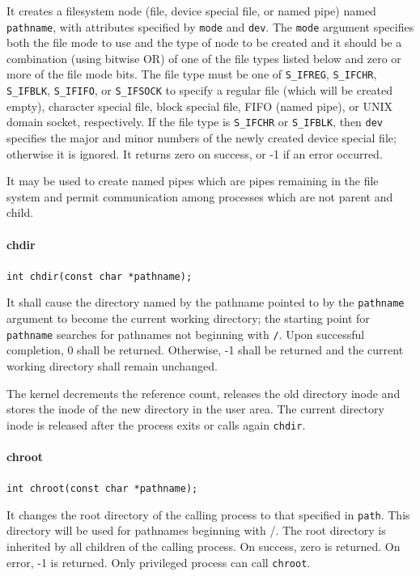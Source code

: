 \documentclass{report}
\begin{document}
It creates a filesystem node (file, device special file, or named pipe) named \texttt{pathname}, with attributes specified by \texttt{mode} and \texttt{dev}. The \texttt{mode} argument specifies both the file mode to use and the type of node to be created and it should be a combination (using bitwise OR) of one of the file types listed below and zero or more of the file mode bits. The file type must be one of \texttt{S\_IFREG}, \texttt{S\_IFCHR}, \texttt{S\_IFBLK}, \texttt{S\_IFIFO}, or \texttt{S\_IFSOCK} to specify a regular file (which will be created empty), character special file, block special file, FIFO (named pipe), or UNIX domain socket, respectively. If the file type is \texttt{S\_IFCHR} or \texttt{S\_IFBLK}, then \texttt{dev} specifies the major and minor numbers of the newly created device special file; otherwise it is ignored. It returns zero on success, or -1 if an error occurred.

It may be used to create named pipes which are pipes remaining in the file system and permit communication among processes which are not parent and child.

\paragraph{chdir}
\texttt{int chdir(const char *pathname);}

It shall cause the directory named by the pathname pointed to by the \texttt{pathname} argument to become the current working directory; the starting point for \texttt{pathname} searches for pathnames not beginning with \texttt{/}. Upon successful completion, 0 shall be returned. Otherwise, -1 shall be returned and the current working directory shall remain unchanged. 

The kernel decrements the reference count, releases the old directory inode and stores the inode of the new directory in the user area. The current directory inode is released after the process exits or calls again \texttt{chdir}.

\paragraph{chroot}
\texttt{int chroot(const char *pathname);}

It changes the root directory of the calling process to that specified in \texttt{path}. This directory will be used for pathnames beginning with /. The root directory is inherited by all children of the calling process. On success, zero is returned. On error, -1 is returned. Only privileged process can call \texttt{chroot}.
\end{document}
